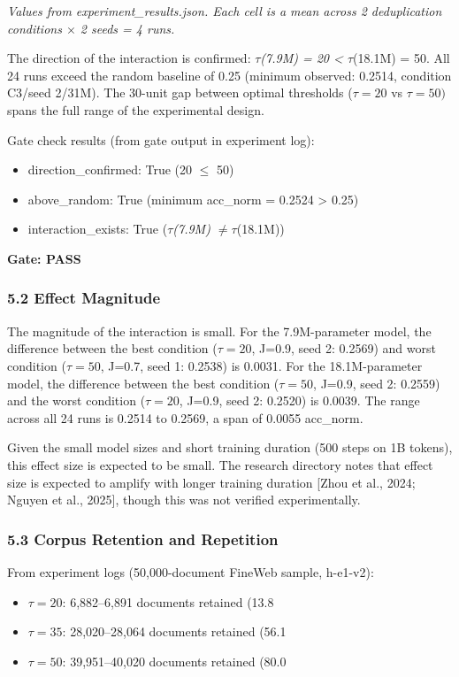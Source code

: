 \textit{Values from experiment\_results.json. Each cell is a mean across 2 deduplication conditions $\times$ 2 seeds = 4 runs.}

The direction of the interaction is confirmed: $\tau$\textit{(7.9M) = 20 < $\tau$}(18.1M) = 50. All 24 runs exceed the random baseline of 0.25 (minimum observed: 0.2514, condition C3/seed 2/31M). The 30-unit gap between optimal thresholds ($\tau =20$ vs $\tau =50)$ spans the full range of the experimental design.

Gate check results (from gate output in experiment log):
\begin{itemize}
\item direction\_confirmed: True (20 $\leq$ 50)
\item above\_random: True (minimum acc\_norm = 0.2524 > 0.25)
\item interaction\_exists: True ($\tau$\textit{(7.9M) $\neq \tau$}(18.1M))
\end{itemize}

\textbf{Gate: PASS}

\subsubsection{5.2 Effect Magnitude}

The magnitude of the interaction is small. For the 7.9M-parameter model, the difference between the best condition ($\tau =20$, J=0.9, seed 2: 0.2569) and worst condition ($\tau =50$, J=0.7, seed 1: 0.2538) is 0.0031. For the 18.1M-parameter model, the difference between the best condition ($\tau =50$, J=0.9, seed 2: 0.2559) and the worst condition ($\tau =20$, J=0.9, seed 2: 0.2520) is 0.0039. The range across all 24 runs is 0.2514 to 0.2569, a span of 0.0055 acc\_norm.

Given the small model sizes and short training duration (500 steps on 1B tokens), this effect size is expected to be small. The research directory notes that effect size is expected to amplify with longer training duration [Zhou et al., 2024; Nguyen et al., 2025], though this was not verified experimentally.

\subsubsection{5.3 Corpus Retention and Repetition}

From experiment logs (50,000-document FineWeb sample, h-e1-v2):
\begin{itemize}
\item $\tau =20$: 6,882--6,891 documents retained (13.8%
\item $\tau =35$: 28,020--28,064 documents retained (56.1%
\item $\tau =50$: 39,951--40,020 documents retained (80.0%
\end{itemize}

